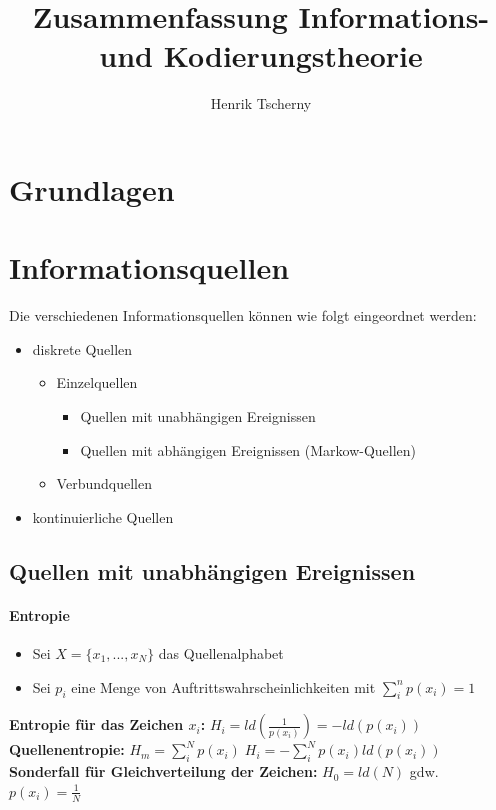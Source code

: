 \documentclass[12pt,a4paper]{article}
\title{Zusammenfassung Informations- und Kodierungstheorie}
\author{Henrik Tscherny}
\begin{document}
\maketitle
\tableofcontents
\section{Grundlagen}

\section{Informationsquellen}
Die verschiedenen Informationsquellen können wie folgt eingeordnet werden:
\begin{itemize}
\item diskrete Quellen
\begin{itemize}
\item Einzelquellen
\begin{itemize}
\item Quellen mit unabhängigen Ereignissen
\item Quellen mit abhängigen Ereignissen (Markow-Quellen)
\end{itemize}
\item Verbundquellen
\end{itemize}
\item kontinuierliche Quellen
\end{itemize}
\newpage
\subsection{Quellen mit unabhängigen Ereignissen}

\paragraph{Entropie\\}
\begin{itemize}
\item Sei $X = \{x_1, ..., x_N \}$ das Quellenalphabet
\item Sei $p_i$ eine Menge von Auftrittswahrscheinlichkeiten mit $\sum_i^n p(x_i) = 1$
\end{itemize}
\textbf{Entropie für das Zeichen $x_i$:} $H_i = ld(\frac{1}{p(x_i)}) = -ld(p(x_i))$\\
\textbf{Quellenentropie:} $H_m = \sum_i^N p(x_i)\; H_i = -\sum_i^N p(x_i) ld(p(x_i))$\\
\textbf{Sonderfall für Gleichverteilung der Zeichen:} $H_0 = ld(N)$ gdw. $p(x_i) = \frac{1}{N}$
\end{document}

